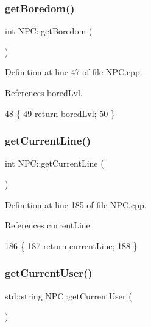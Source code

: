 \subsubsection{\texorpdfstring{get\+Boredom()}{getBoredom()}}
{\footnotesize\ttfamily int N\+P\+C\+::get\+Boredom (\begin{DoxyParamCaption}{ }\end{DoxyParamCaption})}



Definition at line 47 of file N\+P\+C.\+cpp.



References bored\+Lvl.


\begin{DoxyCode}
48 \{
49     \textcolor{keywordflow}{return} \hyperlink{class_n_p_c_a1f67b7dfca770653fc523dfc558e7fdf}{boredLvl};
50 \}
\end{DoxyCode}
\mbox{\label{class_n_p_c_a83d65db3ffe79025091a655d92fe4f27}} 
\subsubsection{\texorpdfstring{get\+Current\+Line()}{getCurrentLine()}}
{\footnotesize\ttfamily int N\+P\+C\+::get\+Current\+Line (\begin{DoxyParamCaption}{ }\end{DoxyParamCaption})}



Definition at line 185 of file N\+P\+C.\+cpp.



References current\+Line.


\begin{DoxyCode}
186 \{
187     \textcolor{keywordflow}{return} \hyperlink{class_n_p_c_a0969e4514a21f3b2966a24d78e9e3343}{currentLine};
188 \}
\end{DoxyCode}
\mbox{\label{class_n_p_c_a289f4c34cf597a7e61f787844f80a356}} 
\subsubsection{\texorpdfstring{get\+Current\+User()}{getCurrentUser()}}
{\footnotesize\ttfamily std\+::string N\+P\+C\+::get\+Current\+User (\begin{DoxyParamCaption}{ }\end{DoxyParamCaption})}



